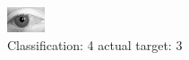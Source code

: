 \begin{figure}[h!]
\begin{center}
\includegraphics[width=0.60\columnwidth]{figures/ID2825_class_4_target_3.png}
\end{center}
\caption{ Classification: 4 actual target: 3}
\label{fig:ID2825_class_4_target_3}
\end{figure}
